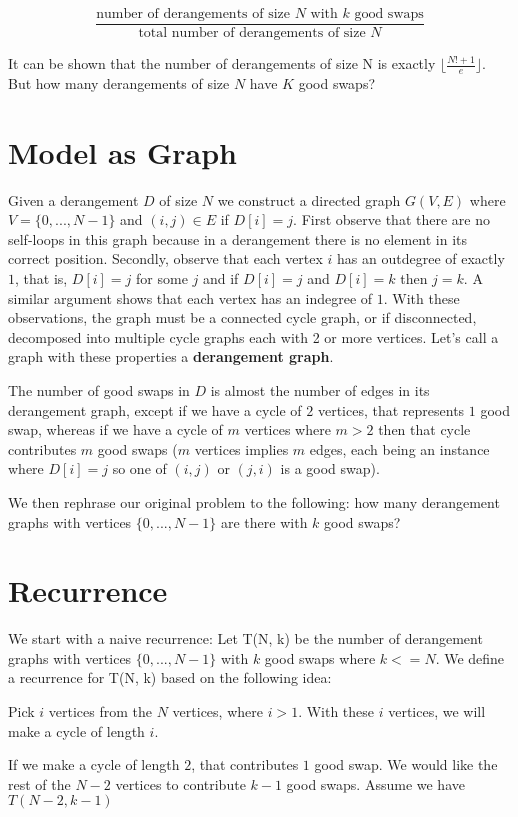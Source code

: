 \documentclass[12pt]{article}
\begin{document}
\[ \frac{\text{number of derangements of size $N$ with $k$ good swaps}}{\text{total number of derangements of size $N$}} \]

It can be shown that the number of derangements of size N is exactly $\lfloor \frac{N! + 1}{e} \rfloor$.
But how many derangements of size $N$ have $K$ good swaps?


\section{Model as Graph}
Given a derangement $D$ of size $N$ we construct a directed graph $G(V, E)$ where $V = \{0, ..., N - 1\}$
and $(i, j) \in E$ if $D[i] = j$. First observe that there are no self-loops in this graph because in 
a derangement there is no element in its correct position. Secondly, observe that each vertex $i$ has an outdegree
of exactly $1$, that is, $D[i] = j$ for some $j$ and if $D[i] = j$ and $D[i] = k$ then $j = k$. A similar argument shows that each
vertex has an indegree of $1$. With these observations, the graph must be a connected cycle graph, or if
disconnected, decomposed into multiple cycle graphs each with 2 or more vertices.
Let's call a graph with these properties a \textbf{derangement graph}.

The number of good swaps in $D$ is almost the number of edges in its derangement graph, except if we have a cycle of $2$ vertices,
that represents $1$ good swap, whereas if we have a cycle of $m$ vertices where $m > 2$ then that cycle contributes
$m$ good swaps ($m$ vertices implies $m$ edges, each being an instance where $D[i] = j$ so one of $(i, j)$ or 
$(j, i)$ is a good swap).

We then rephrase our original problem to the following: how many derangement graphs with
vertices $\{0, ..., N - 1\}$ are there with $k$ good swaps?

\section{Recurrence}
We start with a naive recurrence:
Let T(N, k) be the number of derangement graphs with vertices $\{0, ..., N - 1\}$ with $k$ good swaps where
$k <= N$.
We define a recurrence for T(N, k) based on the following idea:

Pick $i$ vertices from the $N$ vertices, where $i > 1$. With these $i$ vertices, we will make a cycle of length $i$.

If we make a cycle of length $2$, that contributes $1$ good swap.
We would like the rest of the $N - 2$ vertices to contribute $k - 1$
good swaps. Assume we have $T(N - 2, k - 1)$
\end{document}
